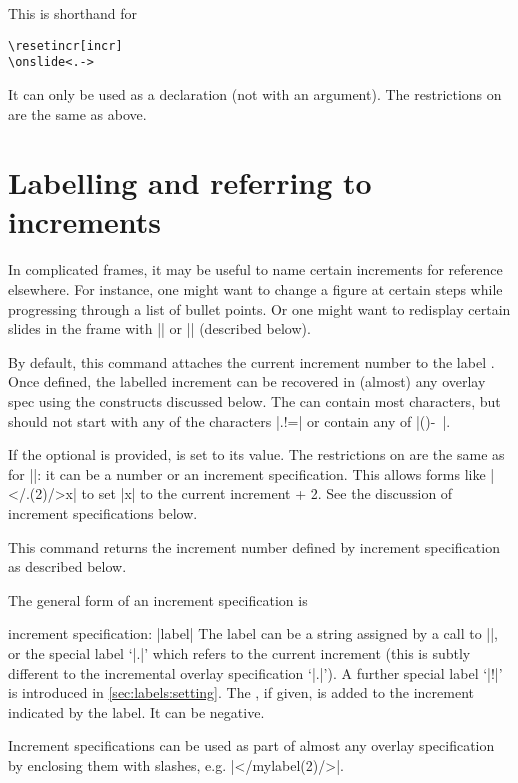 \documentclass[a4paper]{ltxdoc}
\begin{document}
\begin{command}{\fromincr{}}
  This is shorthand for
\begin{verbatim}
\resetincr[incr]
\onslide<.->
\end{verbatim}
It can only be used as a declaration (not with an argument).  The restrictions
on  are the same as above.  
\end{command}


\section{Labelling and referring to increments}\label{sec:labels}

In complicated frames, it may be useful to name certain increments for reference
elsewhere.  For instance, one might want to change a figure at certain steps
while progressing through a list of bullet points.  Or one might want to
redisplay certain slides in the frame with |\afterframe| or |\handoutframe|
(described below).

\begin{command}{\incrlabel{}}
  By default, this command attaches the current increment number to the label
  .  Once defined, the labelled increment can be recovered in
  (almost) any overlay spec using the constructs discussed below.  The
   can contain most characters, but should not start with any of the
  characters |.!=| or contain any of |()-~|.

  If the optional  is provided,  is set to its value.
  The restrictions on  are the same as for |\resetincr|: it can be a
  number or an increment specification.  This allows forms like
  |\incrlabel</.(2)/>{x}| to set |x| to the current increment + 2.  See the
  discussion of increment specifications below.
\end{command}

\begin{command}{\incrref {}}
  This command returns the increment number defined by increment specification
   as described below.
\end{command}

\noindent
The general form of an increment specification is
\begin{command}{{increment specification}: |label|}
  The label can be a string assigned by a call to |\incrlabel|, or the special
  label `|.|' which refers to the current increment (this is subtly different to
  the incremental overlay specification `|.|').  A further special label `|!|'
  is introduced in \cref{sec:labels:setting}.  The , if given, is
  added to the increment indicated by the label.  It can be negative.

  Increment specifications can be used as part of almost any overlay
  specification by enclosing them with slashes, e.g. |</mylabel(2)/>|.
\end{command}
\end{document}
